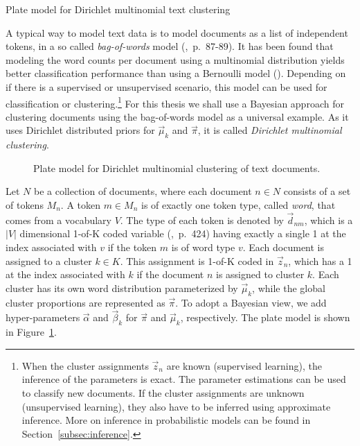 \begin{Example} Plate model for Dirichlet multinomial text clustering
\label{ex:clustering-pm}

A typical way to model text data is to model documents as a list of independent tokens, in a so called \emph{bag-of-words} model (\cite{murphy2012machine},~p.~87-89). It has been found that modeling the word counts per document using a multinomial distribution yields better classification performance than using a Bernoulli model (\cite{mccallum1998comparison}). Depending on if there is a supervised or unsupervised scenario, this model can be used for classification or clustering.\footnote{When the cluster assignments $\vec z_n$ are known (supervised learning), the inference of the parameters is exact. The parameter estimations can be used to classify new documents. If the cluster assignments are unknown (unsupervised learning), they also have to be inferred using approximate inference. More on inference in probabilistic models can be found in Section~\ref{subsec:inference}.} For this thesis we shall use a Bayesian approach for clustering documents using the bag-of-words model as a universal example. As it uses Dirichlet distributed priors for $\vec \mu_k$ and $\vec \pi$, it is called \emph{Dirichlet multinomial clustering}.

\begin{figure}[t]
	\begin{center}
    	\scalebox{\tikzScale}{\adjustTikzSize }
	\end{center}
\caption[Plate model for Dirichlet multinomial clustering of text documents]{Plate model for Dirichlet multinomial clustering of text documents.}
		\label{fig:clustering_platemodel}
\end{figure}

Let $N$ be a collection of documents, where each document $n \in N$ consists of a set of tokens $M_n$. A token $m \in M_n$ is of exactly one token type, called \emph{word}, that comes from a vocabulary $V$. The type of each token is denoted by $\vec d_{nm}$, which is a $|V|$ dimensional 1-of-K coded variable (\cite{bishop2006pattern},~p.~424) having exactly a single 1 at the index associated with $v$ if the token $m$ is of word type $v$. Each document is assigned to a cluster $k \in K$. This assignment is 1-of-K coded in $\vec z_{n}$, which has a 1 at the index associated with $k$ if the document $n$ is assigned to cluster $k$. Each cluster has its own word distribution parameterized by $\vec \mu_k$, while the global cluster proportions are represented as $\vec \pi$. To adopt a Bayesian view, we add hyper-parameters $\vec \alpha$ and $\vec \beta_k$ for $\vec \pi$ and $\vec \mu_k$, respectively. The plate model is shown in Figure~\ref{fig:clustering_platemodel}.


\end{Example}
